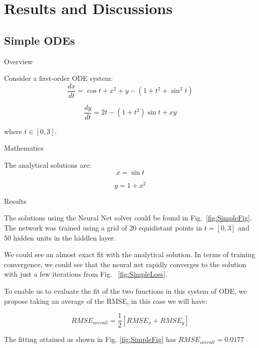 \documentclass[11pt]{article}
\begin{document}
\section{Results and Discussions}
\subsection{Simple ODEs}
Overview

Consider a first-order ODE system:
    \begin{equation}
      \frac{dx}{dt} = \cos t+x^2 + y - (1 + t^2 +\sin^2t)
      \label{eq:simple_eq1}
    \end{equation}
    
     \begin{equation}
      \frac{dy}{dt} = 2t - (1 + t^2)\sin t + xy
      \label{eq:simple_eq2}
    \end{equation}

    
where $t \in [0, 3]$.

Mathematics

The analytical solutions are:
    \begin{equation}
      x = \sin t
      \label{eq:simple_eq3}
    \end{equation}
    
     \begin{equation}
      y= 1 + x^2
      \label{eq:simple_eq4}
    \end{equation}

Results 

The solutions using the Neural Net solver could be found in Fig.~\ref{fig:SimpleFig}. The network was trained using a grid of 20 equidistant points in $t = [0, 3]$ and 50 hidden units in the hiddlen layer. 

We could see an almost exact fit with the analytical solution. In terms of training convergence, we could see that the neural net rapidly converges to the solution with just a few iterations from Fig. ~\ref{fig:SimpleLoss}.

To enable us to evaluate the fit of the two functions in this system of ODE, we propose taking an average of the RMSE, in this case we will have:

\begin{equation}
RMSE_{overall} = \frac{1}{2}[RMSE_{x} + RMSE_{y}]
\end{equation}

The fitting attained as shown in Fig. \ref{fig:SimpleFig} has $RMSE_{overall} = 0.0177$
\end{document}
